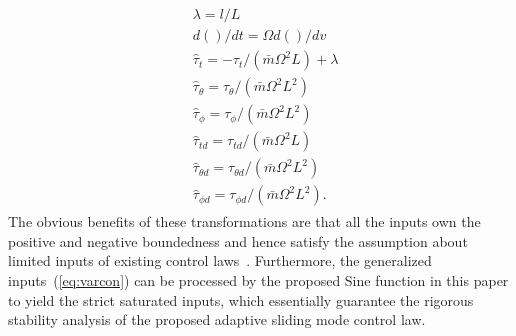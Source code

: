 \documentclass[3p]{elsarticle}
\theoremstyle{plain}
\theoremstyle{remark}
\begin{document}
{\begin{align}
\begin{split}
&\lambda=l/L\\
&d()/dt=\Omega d()/dv\\
&\hat{\tau}_t=-\tau_t/(\bar{m}\Omega^2L)+\lambda\\
&\hat{\tau}_\theta=\tau_\theta/(\bar{m}\Omega^2L^2)\\
&\hat{\tau}_\phi = \tau_\phi/(\bar{m}\Omega^2L^2)\\
&\hat{\tau}_{td}=\tau_{td}/(\bar{m}\Omega^2L)\\
&\hat{\tau}_{\theta d}=\tau_{\theta d}/(\bar{m}\Omega^2L^2)\\
&\hat{\tau}_{\phi d}= \tau_{\phi d}/(\bar{m}\Omega^2L^2)\label{eq:varcon}.
\end{split}
\end{align}
The obvious benefits of these transformations are that all the inputs own the positive and negative boundedness and hence satisfy the assumption about limited inputs of existing control laws~\cite{Hu2008552,6060930}. Furthermore, the generalized inputs~(\ref{eq:varcon}) can be processed by the proposed Sine function in this paper to yield the strict saturated inputs, which essentially guarantee the rigorous stability analysis of the proposed adaptive sliding mode control law.}
\end{document}
